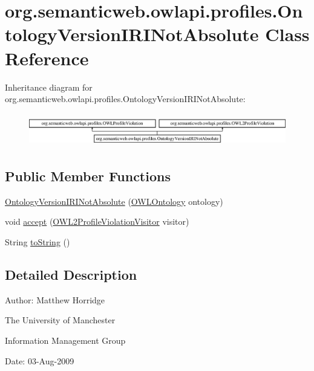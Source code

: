\hypertarget{classorg_1_1semanticweb_1_1owlapi_1_1profiles_1_1_ontology_version_i_r_i_not_absolute}{\section{org.\-semanticweb.\-owlapi.\-profiles.\-Ontology\-Version\-I\-R\-I\-Not\-Absolute Class Reference}
\label{classorg_1_1semanticweb_1_1owlapi_1_1profiles_1_1_ontology_version_i_r_i_not_absolute}
}
Inheritance diagram for org.\-semanticweb.\-owlapi.\-profiles.\-Ontology\-Version\-I\-R\-I\-Not\-Absolute\-:\begin{figure}[H]
\begin{center}
\leavevmode
\includegraphics[height=1.465969cm]{classorg_1_1semanticweb_1_1owlapi_1_1profiles_1_1_ontology_version_i_r_i_not_absolute}
\end{center}
\end{figure}
\subsection*{Public Member Functions}
\begin{DoxyCompactItemize}
\item 
\hyperlink{classorg_1_1semanticweb_1_1owlapi_1_1profiles_1_1_ontology_version_i_r_i_not_absolute_af8a4d48e88b2150696eb76d64347d727}{Ontology\-Version\-I\-R\-I\-Not\-Absolute} (\hyperlink{interfaceorg_1_1semanticweb_1_1owlapi_1_1model_1_1_o_w_l_ontology}{O\-W\-L\-Ontology} ontology)
\item 
void \hyperlink{classorg_1_1semanticweb_1_1owlapi_1_1profiles_1_1_ontology_version_i_r_i_not_absolute_a1aabbb3087a21ba0886c5a16086c08a2}{accept} (\hyperlink{interfaceorg_1_1semanticweb_1_1owlapi_1_1profiles_1_1_o_w_l2_profile_violation_visitor}{O\-W\-L2\-Profile\-Violation\-Visitor} visitor)
\item 
String \hyperlink{classorg_1_1semanticweb_1_1owlapi_1_1profiles_1_1_ontology_version_i_r_i_not_absolute_a48bb72cb50323bdadfaa4dff813b9f1c}{to\-String} ()
\end{DoxyCompactItemize}


\subsection{Detailed Description}
Author\-: Matthew Horridge\par
 The University of Manchester\par
 Information Management Group\par
 Date\-: 03-\/\-Aug-\/2009 

